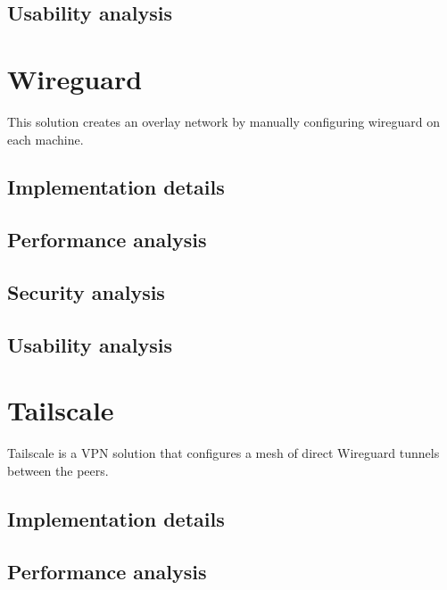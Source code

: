 \hypertarget{usability-analysis}{%
\section{Usability analysis}\label{usability-analysis}}

\hypertarget{wireguard}{%
\chapter{Wireguard}\label{wireguard}}

This solution creates an overlay network by manually configuring
wireguard on each machine.

\hypertarget{implementation-details}{%
\section{Implementation details}\label{implementation-details}}

\hypertarget{performance-analysis}{%
\section{Performance analysis}\label{performance-analysis}}

\hypertarget{security-analysis}{%
\section{Security analysis}\label{security-analysis}}

\hypertarget{usability-analysis}{%
\section{Usability analysis}\label{usability-analysis}}

\hypertarget{tailscale}{%
\chapter{Tailscale}\label{tailscale}}

Tailscale is a VPN solution that configures a mesh of direct Wireguard
tunnels between the peers.

\hypertarget{implementation-details}{%
\section{Implementation details}\label{implementation-details}}

\hypertarget{performance-analysis}{%
\section{Performance analysis}\label{performance-analysis}}

